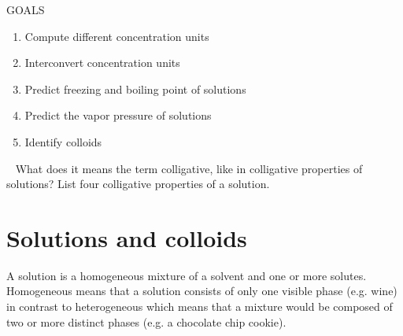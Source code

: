 \documentclass[main.tex]{subfiles}
\begin{document}
\begin{marginfigure}%
\begin{mytcbox}{GOALS}
\begin{enumerate}[label=\protect\circled{\color{white}\arabic*}]
\item Compute different concentration units
\item Interconvert concentration units
\item Predict freezing and boiling point of solutions
\item Predict the vapor pressure of solutions
\item Identify colloids
\end{enumerate}
\end{mytcbox}
\vspace{1cm}
\begin{tcolorbox}[enhanced,colback=red!5!white,colframe=black!50!red,boxrule=1pt,
  arc=0pt,outer arc=0pt,drop heavy lifted shadow]
\faGears\ 
 What does it means the term colligative, like in colligative properties of solutions? List four colligative properties of a solution.  \end{tcolorbox}
\end{marginfigure}%



\section{Solutions and colloids}
A solution is a homogeneous mixture of a solvent and one or more solutes. Homogeneous means that a solution consists of only one visible phase (e.g. wine) in contrast to heterogeneous which means that a mixture would be composed of two or more distinct phases (e.g. a chocolate chip cookie). 
\end{document}
